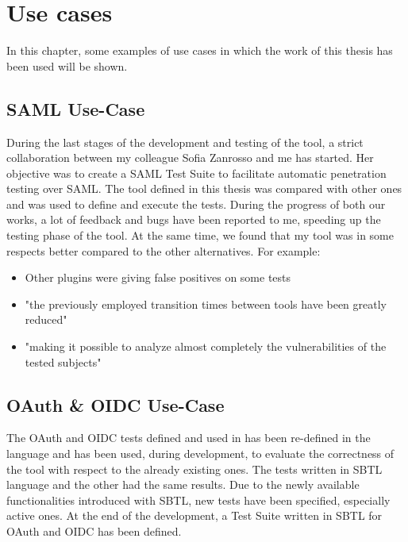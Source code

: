 \chapter{Use cases}
\label{chap:Use_cases}
In this chapter, some examples of use cases in which the work of this thesis has been used will be shown.

\section{SAML Use-Case}
During the last stages of the development and testing of the tool, a strict collaboration between my colleague Sofia Zanrosso and me has started. Her objective was to create a \gls{SAML} Test Suite to facilitate automatic penetration testing over \gls{SAML}\cite{sofia_zanrosso}. The tool defined in this thesis was compared with other ones and was used to define and execute the tests. During the progress of both our works, a lot of feedback and bugs have been reported to me, speeding up the testing phase of the tool. At the same time, we found that my tool was in some respects better compared to the other alternatives. For example:
\begin{itemize}
    \item Other plugins were giving false positives on some tests
    \item "the previously employed transition times between tools have been greatly reduced"
    \item "making it possible to analyze almost completely the vulnerabilities of the tested subjects"
\end{itemize}

\section{OAuth \& OIDC Use-Case}    
The \gls{OAuth} and \gls{OIDC} tests defined and used in \cite{claudio_grisenti,wendy_barreto} has been re-defined in the language and has been used, during development, to evaluate the correctness of the tool with respect to the already existing ones. The tests written in SBTL language and the other had the same results. Due to the newly available functionalities introduced with SBTL, new tests have been specified, especially active ones.
At the end of the development, a Test Suite written in SBTL for OAuth and OIDC has been defined.







